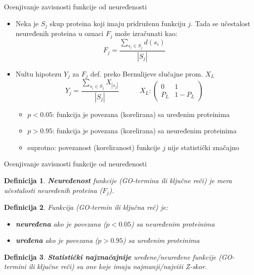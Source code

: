 \documentclass{beamer}
\newcommand{\keyword}[1]{\textbf{#1}}
\newtheorem{definicija}{Definicija}
\begin{document}

\begin{frame}{Ocenjivanje zavisnosti funkcije od neuređenosti}

  \begin{itemize}
    \item 
      Neka je $S_j$ skup proteina koji imaju pridruženu funkciju $j$. Tada se
      učestalost neuređenih proteina u oznaci $F_j$ može izračunati kao:
      $$F_j = \dfrac{\sum_{s_i \in S_j} d(s_i)} {|S_j|} $$

    \item
      Nultu hipotezu $Y_j$ za $F_j$  def. preko Bernulijeve slučajne prom. $X_L$
      $$
      Y_j = \dfrac {\sum_{s_i \in S_j} {X_{|s_j|}}}{|S_j|}
      \quad \quad \quad
    X_L : \begin{pmatrix} 0 & 1\\ P_L & 1-P_L \end{pmatrix}
      $$
      \begin{itemize}
        \item $p<0.05$: funkcija je povezana (korelirana) sa uređenim proteinima
        \item $p>0.95$: funkcija je povezana (korelirana) sa neuređenim proteinima
        \item suprotno: povezanost (koreliranost) funkcije $j$ nije statistički značajno  
      \end{itemize}


  \end{itemize}

\end{frame}

\begin{frame}{Ocenjivanje zavisnosti funkcije od neuređenosti}
  \begin{definicija}
    \keyword{Neuređenost} funkcije (GO-termina ili ključne reči) je mera učestalosti
    neuređenih proteina ($F_j$).
  \end{definicija}
  \begin{definicija}
    Funkcija (GO-termin ili ključna reč) je:
    \begin{itemize}
      \item \keyword{neuređena} ako je povezana ($p<0.05$) sa neuređenim proteinima
      \item \keyword{uređena} ako je povezana ($p>0.95$) sa uređenim proteinima
    \end{itemize}
  \end{definicija}
  \begin{definicija}
    \keyword{Statistički najznačajnije} uređene/neuređene funkcije
    (GO-termini ili ključne reči) su one koje imaju najmanji/najviši Z-skor.
  \end{definicija}
\end{frame}
\end{document}
